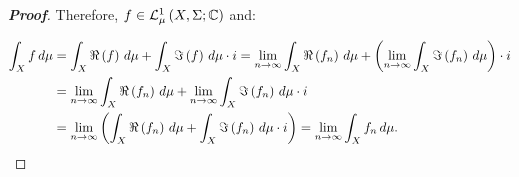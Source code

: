 \begin{theorem}
\begin{proof}[\rm\textbf{Proof}]
    Therefore, $f\in\mathcal{L}^1_{\mu}\left(X,\Sigma;\mathbb{C}\right)$ and:

    \begin{equation}
      \begin{split}
        \int_{X}{f\,d\mu} & =\int_{X}{\Re\left(f\right)\,d\mu}+\int_{X}{\Im\left(f\right)\,d\mu}\cdot i=\lim_{n\to\infty}{\int_{X}{\Re\left(f_n\right)\,d\mu}}+\left(\lim_{n\to\infty}{\int_{X}{\Im\left(f_n\right)\,d\mu}}\right)\cdot i\\
        & =\lim_{n\to\infty}{\int_{X}{\Re\left(f_n\right)\,d\mu}}+\lim_{n\to\infty}{\int_{X}{\Im\left(f_n\right)\,d\mu}\cdot i}\\
        & =\lim_{n\to\infty}{\left(\int_{X}{\Re\left(f_n\right)\,d\mu}+\int_{X}{\Im\left(f_n\right)\,d\mu}\cdot i\right)}=\lim_{n\to\infty}{\int_{X}{f_n\,d\mu}}.
      \end{split}
    \end{equation}
  \end{proof}
\end{theorem}

